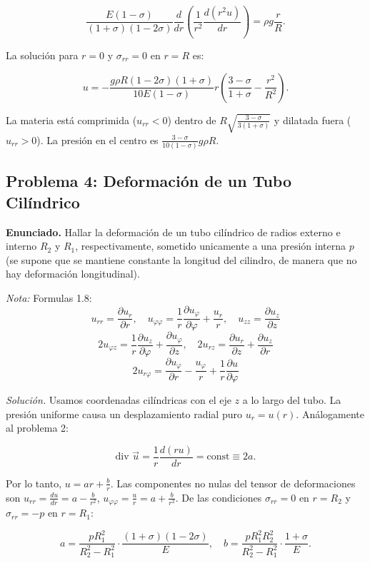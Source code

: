 \documentclass{article}
\begin{document}
$$
\frac{E(1-\sigma)}{(1+\sigma)(1-2\sigma)} \frac{d}{dr} \left( \frac{1}{r^2} \frac{d(r^2 u)}{dr} \right) = \rho g \frac{r}{R}.
$$

La solución para $r = 0$ y $\sigma_{rr} = 0$ en $r = R$ es:

$$
u = -\frac{g\rho R(1-2\sigma)(1+\sigma)}{10E(1-\sigma)} r \left(\frac{3-\sigma}{1+\sigma} - \frac{r^2}{R^2}\right).
$$

La materia está comprimida ($u_{rr} < 0$) dentro de $R\sqrt{\frac{3-\sigma}{3(1+\sigma)}}$ y dilatada fuera ($u_{rr} > 0$). La presión en el centro es $\frac{3-\sigma}{10(1-\sigma)} g \rho R$.

\subsection*{Problema 4: Deformación de un Tubo Cilíndrico}
\textbf{Enunciado.} Hallar la deformación de un tubo cilíndrico de radios externo e interno $R_2$ y $R_1$, respectivamente, sometido unicamente a una presión interna $p$ (se supone que se mantiene constante la longitud del cilindro, de manera que no hay deformación longitudinal).

\textit{Nota:} Formulas 1.8: $$ u_{rr} = \frac{\partial u_r}{\partial r}, \quad u_{\varphi \varphi}=\frac{1}{r}\frac{\partial u_\varphi}{\partial \varphi} + \frac{u_r}{r}, \quad u_{zz} = \frac{\partial u_z}{\partial z} $$
$$ 2u_{\varphi z}=\frac{1}{r}\frac{\partial u_z}{\partial \varphi}+\frac{\partial u_\varphi}{\partial z}, \quad 2u_{rz}=\frac{\partial u_r}{\partial z} + \frac{\partial u_z}{\partial r}$$
$$ 2u_{r \varphi}= \frac{\partial u_\varphi}{\partial r}-\frac{u_\varphi}{r}+\frac{1}{r}\frac{\partial u}{\partial \varphi} $$

\textit{Solución.} Usamos coordenadas cilíndricas con el eje $z$ a lo largo del tubo. La presión uniforme causa un desplazamiento radial puro $u_r = u(r)$. Análogamente al problema 2:

$$
\text{div } \vec{u} = \frac{1}{r} \frac{d(ru)}{dr} = \text{const} \equiv 2a.
$$

Por lo tanto, $u = ar + \frac{b}{r}$. Las componentes no nulas del tensor de deformaciones son $u_{rr} = \frac{du}{dr} = a - \frac{b}{r^2}$, $u_{\varphi\varphi} = \frac{u}{r} = a + \frac{b}{r^2}$. De las condiciones $\sigma_{rr} = 0$ en $r = R_2$ y $\sigma_{rr} = -p$ en $r = R_1$:

$$
a = \frac{pR_1^2}{R_2^2 - R_1^2} \cdot \frac{(1+\sigma)(1-2\sigma)}{E}, \quad b = \frac{pR_1^2 R_2^2}{R_2^2 - R_1^2} \cdot \frac{1+\sigma}{E}.
$$
\end{document}

